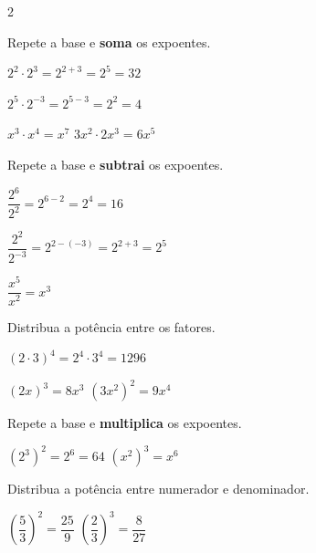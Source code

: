 \documentclass[12pt]{article}
\begin{document}
\begin{multicols}{2}

Repete a base e \textbf{soma} os expoentes.



$2^2 \cdot 2^3 = 2^{2+3} = 2^5 = 32$

$2^5 \cdot 2^{-3} = 2^{5-3} = 2^2 = 4$

$x^3 \cdot x^4 = x^7$ \qquad $3x^2 \cdot 2x^3 = 6x^5$


Repete a base e \textbf{subtrai} os expoentes.



$\dfrac{2^6}{2^2} = 2^{6-2} = 2^4 = 16$ \vspace{6px}

$\dfrac{2^2}{2^{-3}} = 2^{2-(-3)} = 2^{2+3} = 2^5$ \vspace{6px}

$\dfrac{x^5}{x^2} = x^3$


Distribua a potência entre os fatores.



$(2 \cdot 3)^4 = 2^4 \cdot 3^4 = 1296$

$(2x)^3 = 8x^3$ \qquad $(3x^2)^2 = 9x^4$


Repete a base e \textbf{multiplica} os expoentes.



$(2^3)^2 = 2^{6} = 64$ \qquad $(x^2)^3 = x^6$


Distribua a potência entre numerador e denominador.



$\left(\dfrac{5}{3}\right)^2 = \dfrac{25}{9}$ \qquad $\left(\dfrac{2}{3}\right)^3 = \dfrac{8}{27}$ \vspace{6px}



\end{multicols}
\end{document}
